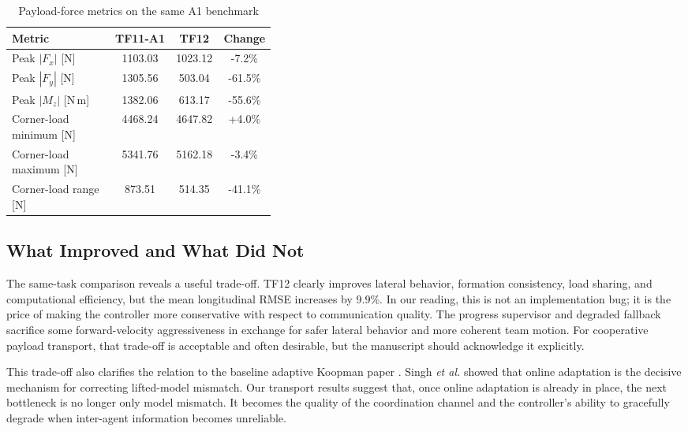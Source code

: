 \documentclass[twocolumn,3p,times,procedia]{elsarticle}
\newcommand{\tfone}{TF11-A1}
\newcommand{\tftwo}{TF12}
\begin{document}
\begin{table}[h]
\footnotesize
\centering
\begin{threeparttable}
\setlength{\abovecaptionskip}{0pt}
\caption{Payload-force metrics on the same A1 benchmark}
\label{tab:payload_results}
\begin{tabular}{p{0.39\linewidth} c c c}
\toprule
Metric & \tfone{} & \tftwo{} & Change \\
\midrule
Peak $|F_x|$ [N] & 1103.03 & 1023.12 & -7.2\% \\
Peak $|F_y|$ [N] & 1305.56 & 503.04 & -61.5\% \\
Peak $|M_z|$ [N\,m] & 1382.06 & 613.17 & -55.6\% \\
Corner-load minimum [N] & 4468.24 & 4647.82 & +4.0\% \\
Corner-load maximum [N] & 5341.76 & 5162.18 & -3.4\% \\
Corner-load range [N] & 873.51 & 514.35 & -41.1\% \\
\bottomrule
\end{tabular}
\end{threeparttable}
\end{table}

\subsection{What Improved and What Did Not}
The same-task comparison reveals a useful trade-off. \tftwo{} clearly improves lateral behavior, formation consistency, load sharing, and computational efficiency, but the mean longitudinal RMSE increases by 9.9\%. In our reading, this is not an implementation bug; it is the price of making the controller more conservative with respect to communication quality. The progress supervisor and degraded fallback sacrifice some forward-velocity aggressiveness in exchange for safer lateral behavior and more coherent team motion. For cooperative payload transport, that trade-off is acceptable and often desirable, but the manuscript should acknowledge it explicitly.

This trade-off also clarifies the relation to the baseline adaptive Koopman paper \cite{singh2024adaptive}. Singh \emph{et al.} showed that online adaptation is the decisive mechanism for correcting lifted-model mismatch. Our transport results suggest that, once online adaptation is already in place, the next bottleneck is no longer only model mismatch. It becomes the quality of the coordination channel and the controller's ability to gracefully degrade when inter-agent information becomes unreliable.
\end{document}
